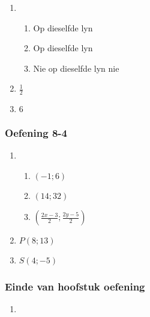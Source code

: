 {\begin{multicols}{3}
\begin{enumerate}[noitemsep, label=\textbf{\arabic*}. ]
\item %
\begin{enumerate}[noitemsep, label=\textbf{(\alph*)} ]
\item Op dieselfde lyn%
\item Op dieselfde lyn%
\item Nie op dieselfde lyn nie %
\end{enumerate}
\item $\frac{1}{2}$%
\item $6$%
\end{enumerate}
\subsubsection*{Oefening 8-4} %
\begin{enumerate}[noitemsep, label=\textbf{\arabic*}. ]
\item %
  \begin{enumerate}[noitemsep, label=\textbf{(\alph*)} ]
\item $(-1 ; 6)$%
\item $(14 ; 32)$%
\item $(\frac{2x - 3}{2} ; \frac{2y - 5}{2})$%
\end{enumerate}

\item $P(8 ; 13)$%
\item $S(4 ; -5)$%

\end{enumerate}
\subsubsection*{Einde van hoofstuk oefening} %

\begin{enumerate}[noitemsep, label=\textbf{\arabic*}. ] 
\item %


\end{enumerate}
\end{multicols}}

